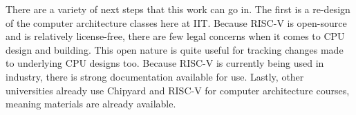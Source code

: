 \documentclass[10pt,letterpaper,final,twoside,notitlepage]{article}
\begin{document}
There are a variety of next steps that this work can go in.
The first is a re-design of the computer architecture classes here at IIT.\@
Because RISC-V is open-source and is relatively license-free, there are few legal concerns when it comes to CPU design and building.
This open nature is quite useful for tracking changes made to underlying CPU designs too.
Because RISC-V is currently being used in industry, there is strong documentation available for use.
Lastly, other universities already use Chipyard and RISC-V for computer architecture courses, meaning materials are already available.

\printbibliography[heading=bibintoc]{}
\end{document}
